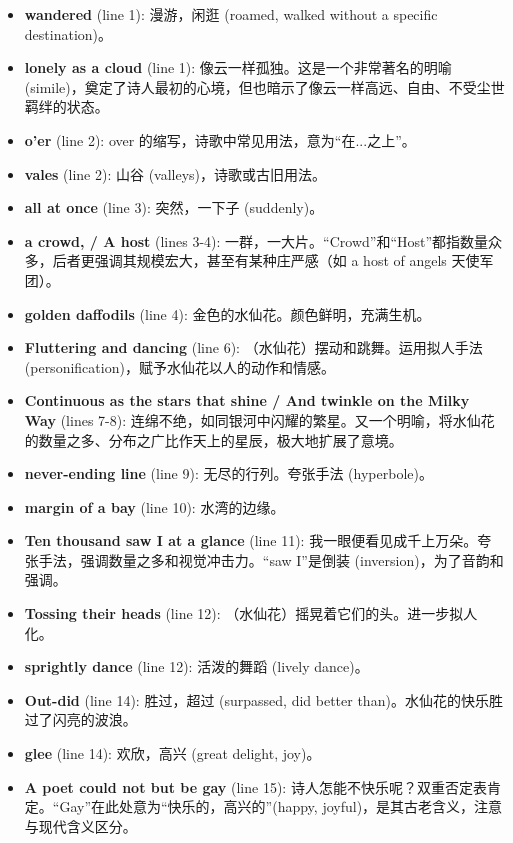 \documentclass[12pt, a4paper]{article}
\begin{document}
\begin{itemize}
    \item \textbf{wandered} (line 1): 漫游，闲逛 (roamed, walked without a specific destination)。
    \item \textbf{lonely as a cloud} (line 1): 像云一样孤独。这是一个非常著名的明喻 (simile)，奠定了诗人最初的心境，但也暗示了像云一样高远、自由、不受尘世羁绊的状态。
    \item \textbf{o'er} (line 2): over 的缩写，诗歌中常见用法，意为“在...之上”。
    \item \textbf{vales} (line 2): 山谷 (valleys)，诗歌或古旧用法。
    \item \textbf{all at once} (line 3): 突然，一下子 (suddenly)。
    \item \textbf{a crowd, / A host} (lines 3-4): 一群，一大片。“Crowd”和“Host”都指数量众多，后者更强调其规模宏大，甚至有某种庄严感（如 a host of angels 天使军团）。
    \item \textbf{golden daffodils} (line 4): 金色的水仙花。颜色鲜明，充满生机。
    \item \textbf{Fluttering and dancing} (line 6): （水仙花）摆动和跳舞。运用拟人手法 (personification)，赋予水仙花以人的动作和情感。
    \item \textbf{Continuous as the stars that shine / And twinkle on the Milky Way} (lines 7-8): 连绵不绝，如同银河中闪耀的繁星。又一个明喻，将水仙花的数量之多、分布之广比作天上的星辰，极大地扩展了意境。
    \item \textbf{never-ending line} (line 9): 无尽的行列。夸张手法 (hyperbole)。
    \item \textbf{margin of a bay} (line 10): 水湾的边缘。
    \item \textbf{Ten thousand saw I at a glance} (line 11): 我一眼便看见成千上万朵。夸张手法，强调数量之多和视觉冲击力。“saw I”是倒装 (inversion)，为了音韵和强调。
    \item \textbf{Tossing their heads} (line 12): （水仙花）摇晃着它们的头。进一步拟人化。
    \item \textbf{sprightly dance} (line 12): 活泼的舞蹈 (lively dance)。
    \item \textbf{Out-did} (line 14): 胜过，超过 (surpassed, did better than)。水仙花的快乐胜过了闪亮的波浪。
    \item \textbf{glee} (line 14): 欢欣，高兴 (great delight, joy)。
    \item \textbf{A poet could not but be gay} (line 15): 诗人怎能不快乐呢？双重否定表肯定。“Gay”在此处意为“快乐的，高兴的”(happy, joyful)，是其古老含义，注意与现代含义区分。

\end{itemize}
\end{document}
